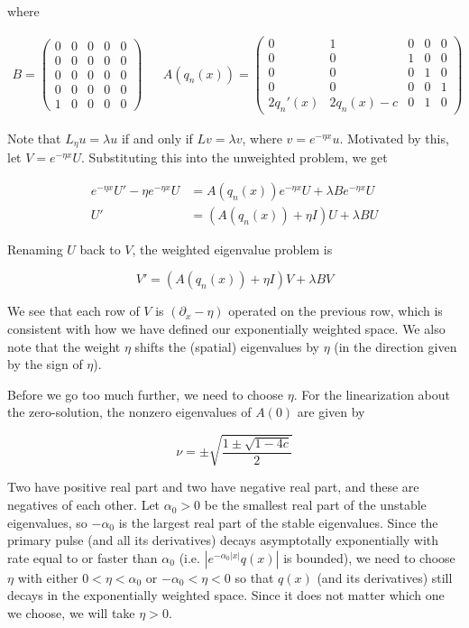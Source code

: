 \documentclass[12pt]{article}
\begin{document}
where

\begin{align*}
B = \begin{pmatrix}0 & 0 & 0 & 0 & 0 \\0 & 0 & 0 & 0 & 0 \\0  & 0 & 0 & 0 & 0 \\0 & 0 & 0 & 0 & 0 \\1 & 0 & 0 & 0 & 0 \end{pmatrix} && 
A(q_n(x)) = \begin{pmatrix}0 & 1 & 0 & 0 & 0 \\0 & 0 & 1 & 0 & 0 \\0 & 0 & 0 & 1 & 0 \\0 & 0 & 0 & 0 & 1 \\
2q_n'(x) & 2q_n(x) - c & 0 & 1 & 0 \end{pmatrix} 
\end{align*}

Note that $L_\eta u = \lambda u$ if and only if $L v = \lambda v$, where $v = e^{-\eta x} u$. Motivated by this, let $V = e^{-\eta x} U$. Substituting this into the unweighted problem, we get

\begin{align*}
e^{-\eta x} U' - \eta e^{-\eta x}U &= A(q_n(x))e^{-\eta x}U + \lambda B e^{-\eta x}U \\
U' &= (A(q_n(x)) + \eta I) U + \lambda B U
\end{align*}

Renaming $U$ back to $V$, the weighted eigenvalue problem is

\begin{equation}\label{weightedeig}
V' = (A(q_n(x)) + \eta I)V + \lambda B V
\end{equation}

We see that each row of $V$ is $(\partial_x - \eta)$ operated on the previous row, which is consistent with how we have defined our exponentially weighted space. We also note that the weight $\eta$ shifts the (spatial) eigenvalues by $\eta$ (in the direction given by the sign of $\eta$). 

Before we go too much further, we need to choose $\eta$. For the linearization about the zero-solution, the nonzero eigenvalues of $A(0)$ are given by

\[
\nu = \pm \sqrt{ \frac{1 \pm \sqrt{1 - 4c} }{2}}
\]

Two have positive real part and two have negative real part, and these are negatives of each other. Let $\alpha_0 > 0$ be the smallest real part of the unstable eigenvalues, so $-\alpha_0$ is the largest real part of the stable eigenvalues. Since the primary pulse (and all its derivatives) decays asymptotally exponentially with rate equal to or faster than $\alpha_0$ (i.e. $|e^{-\alpha_0 |x|} q(x)|$ is bounded), we need to choose $\eta$ with either $0 < \eta < \alpha_0$ or $-\alpha_0 < \eta < 0$ so that $q(x)$ (and its derivatives) still decays in the exponentially weighted space. Since it does not matter which one we choose, we will take $\eta > 0$.\\
\end{document}
